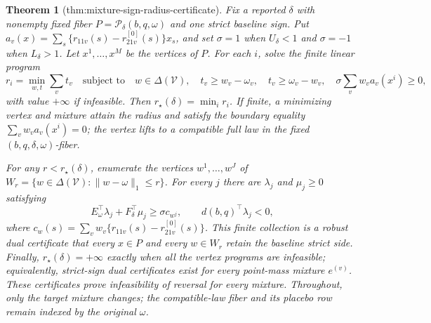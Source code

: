 \documentclass{article}
\newtheorem{theorem}{Theorem}
\begin{document}
\begin{theorem}[thm:mixture-sign-radius-certificate]\label{thm:mixture-sign-radius-certificate}
Fix a reported \(\delta\) with nonempty fixed fiber \(P=\mathcal P_\delta(b,q,\omega)\) and one strict baseline sign.  Put \(a_v(x)=\sum_s\{r_{11v}(s)-r^{[0]}_{21v}(s)\}x_s\), and set \(\sigma=1\) when \(U_\delta<1\) and \(\sigma=-1\) when \(L_\delta>1\).  Let \(x^1,\ldots,x^M\) be the vertices of \(P\).  For each \(i\), solve the finite linear program
\[
r_i=\min_{w,t}\sum_vt_v
\quad\text{subject to}\quad w\in\Delta(\mathcal V),\quad
t_v\geq w_v-\omega_v,\quad t_v\geq\omega_v-w_v,\quad
\sigma\sum_vw_va_v(x^i)\geq0,
\]
with value \(+\infty\) if infeasible.  Then \(r_\star(\delta)=\min_i r_i\).  If finite, a minimizing vertex and mixture attain the radius and satisfy the boundary equality \(\sum_vw_va_v(x^i)=0\); the vertex lifts to a compatible full law in the fixed \((b,q,\delta,\omega)\)-fiber.

For any \(r<r_\star(\delta)\), enumerate the vertices \(w^1,\ldots,w^J\) of \(W_r=\{w\in\Delta(\mathcal V):\lVert w-\omega\rVert_1\leq r\}\).  For every \(j\) there are \(\lambda_j\) and \(\mu_j\geq0\) satisfying
\[
E_\omega^\top\lambda_j+F_\delta^\top\mu_j\geq \sigma c_{w^j},
\qquad d(b,q)^\top\lambda_j<0,
\]
where \(c_w(s)=\sum_vw_v\{r_{11v}(s)-r^{[0]}_{21v}(s)\}\).  This finite collection is a robust dual certificate that every \(x\in P\) and every \(w\in W_r\) retain the baseline strict side.  Finally, \(r_\star(\delta)=+\infty\) exactly when all the vertex programs are infeasible; equivalently, strict-sign dual certificates exist for every point-mass mixture \(e^{(v)}\).  These certificates prove infeasibility of reversal for every mixture.  Throughout, only the target mixture changes; the compatible-law fiber and its placebo row remain indexed by the original \(\omega\).
\end{theorem}
\end{document}
